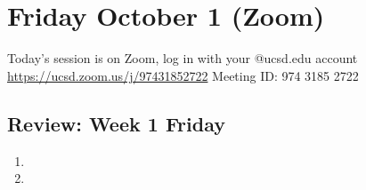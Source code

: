 \section*{Friday October 1 (Zoom)}

Today's session is on Zoom, log in with your @ucsd.edu account \url{https://ucsd.zoom.us/j/97431852722} Meeting ID: 974 3185 2722



\vfill
\newpage




\newpage


\newpage
\subsection*{Review: Week 1 Friday}
\begin{enumerate}
    \item {}
    \item {}
\end{enumerate}
